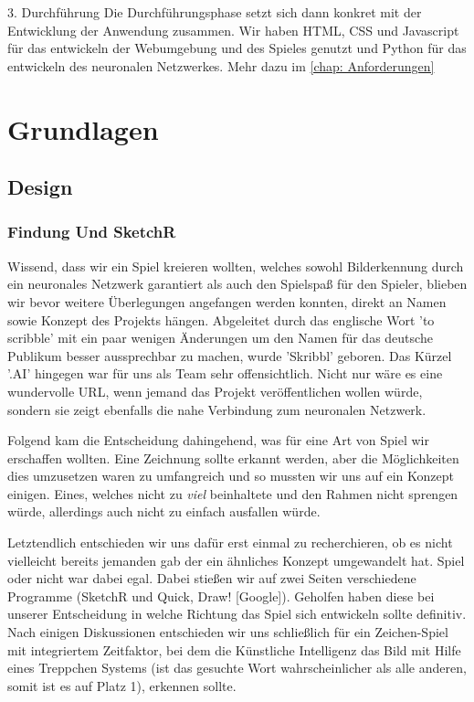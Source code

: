 \documentclass[11pt]{article}
\begin{document}
3. Durchführung
	Die Durchführungsphase setzt sich dann konkret mit der 					Entwicklung der Anwendung zusammen.
	Wir haben HTML, CSS und Javascript für das entwickeln der 			Webumgebung und des Spieles genutzt und Python für das 				entwickeln des neuronalen Netzwerkes.
	Mehr dazu im \autoref{chap: Anforderungen}

\section{Grundlagen}
\label{chap: Grundlagen}
\subsection{Design}
\subsubsection{Findung Und SketchR}

Wissend, dass wir ein Spiel kreieren wollten, welches sowohl Bilderkennung durch ein neuronales Netzwerk garantiert als auch den Spielspaß für den Spieler, blieben wir bevor weitere Überlegungen angefangen werden konnten, direkt an Namen sowie Konzept des Projekts hängen.
Abgeleitet durch das englische Wort 'to scribble' mit ein paar wenigen Änderungen um den Namen für das deutsche Publikum besser aussprechbar zu machen, wurde 'Skribbl' geboren. Das Kürzel '.AI' hingegen war für uns als Team sehr offensichtlich. Nicht nur wäre es eine wundervolle URL, wenn jemand das Projekt veröffentlichen wollen würde, sondern sie zeigt ebenfalls die nahe Verbindung zum neuronalen Netzwerk.

Folgend kam die Entscheidung dahingehend, was für eine Art von Spiel wir erschaffen wollten. Eine Zeichnung sollte erkannt werden, aber die Möglichkeiten dies umzusetzen waren zu umfangreich und so mussten wir uns auf ein Konzept einigen. Eines, welches nicht zu \textit{viel} beinhaltete und den Rahmen nicht sprengen würde, allerdings auch nicht zu einfach ausfallen würde.

Letztendlich entschieden wir uns dafür erst einmal zu recherchieren, ob es nicht vielleicht bereits jemanden gab der ein ähnliches Konzept umgewandelt hat. Spiel oder nicht war dabei egal.
Dabei stießen wir auf zwei Seiten verschiedene Programme (SketchR und Quick, Draw! [Google]). Geholfen haben diese bei unserer Entscheidung in welche Richtung das Spiel sich entwickeln sollte definitiv. Nach einigen Diskussionen entschieden wir uns schließlich für ein Zeichen-Spiel mit integriertem Zeitfaktor, bei dem die Künstliche Intelligenz das Bild mit Hilfe eines Treppchen Systems (ist das gesuchte Wort wahrscheinlicher als alle anderen, somit ist es auf Platz 1), erkennen sollte.
\end{document}
